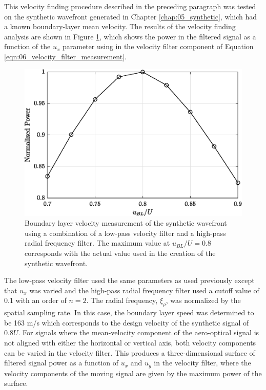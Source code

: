 This velocity finding procedure described in the preceding paragraph was tested on the synthetic wavefront generated in Chapter \ref{chap:05_synthetic}, which had a known boundary-layer mean velocity.
The results of the velocity finding analysis are shown in Figure \ref{fig:06_filter_velocity_measure}, which shows the power in the filtered signal as a function of the $u_x$ parameter using in the velocity filter component of Equation \ref{eqn:06_velocity_filter_measurement}.
\begin{figure}
 \centering
 \includegraphics{../matlab/06_single_sensor_filtering/filter_velocity_measure.eps}
 \caption{Boundary layer velocity measurement of the synthetic wavefront using a combination of a low-pass velocity filter and a high-pass radial frequency filter. The maximum value at $u_{BL}/U=0.8$ corresponds with the actual value used in the creation of the synthetic wavefront.}
 \label{fig:06_filter_velocity_measure}
\end{figure}
The low-pass velocity filter used the same parameters as used previously except that $u_x$ was varied and the high-pass radial frequency filter used a cutoff value of 0.1 with an order of $n=2$.
The radial frequency, $\xi_\rho$, was normalized by the spatial sampling rate.
In this case, the boundary layer speed was determined to be 163 m/s which corresponds to the design velocity of the synthetic signal of $0.8U$.
For signals where the mean-velocity component of the aero-optical signal is not aligned with either the horizontal or vertical axis, both velocity components can be varied in the velocity filter.
This produces a three-dimensional surface of filtered signal power as a function of $u_x$ and $u_y$ in the velocity filter, where the velocity components of the moving signal are given by the maximum power of the surface.
